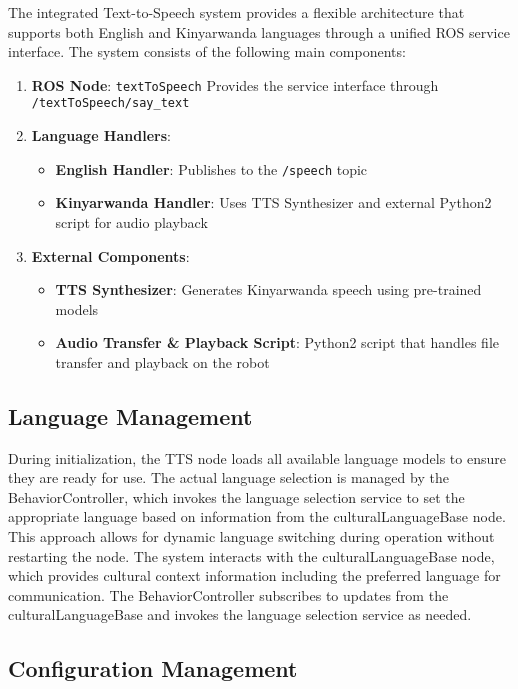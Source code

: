 \documentclass{CSSRforAfrica}
\begin{document}
The integrated Text-to-Speech system provides a flexible architecture that supports both English and Kinyarwanda languages through a unified ROS service interface. The system consists of the following main components:

\begin{enumerate}
    \item\textbf{ROS Node}: \texttt{textToSpeech} Provides the service interface through \texttt{/textToSpeech/say\_text}
    \item \textbf{Language Handlers}:
    \begin{itemize}
        \item \textbf{English Handler}: Publishes to the \texttt{/speech} topic
        \item \textbf{Kinyarwanda Handler}: Uses TTS Synthesizer and external Python2 script for audio playback
    \end{itemize}
    \item \textbf{External Components}:
    \begin{itemize}
        \item \textbf{TTS Synthesizer}: Generates Kinyarwanda speech using pre-trained models
        \item \textbf{Audio Transfer \& Playback Script}: Python2 script that handles file transfer and playback on the robot
    \end{itemize}
\end{enumerate}

\subsection{Language Management}

During initialization, the TTS node loads all available language models to ensure they are ready for use. The actual language selection is managed by the BehaviorController, which invokes the language selection service to set the appropriate language based on information from the culturalLanguageBase node. This approach allows for dynamic language switching during operation without restarting the node.
The system interacts with the culturalLanguageBase node, which provides cultural context information including the preferred language for communication. The BehaviorController subscribes to updates from the culturalLanguageBase and invokes the language selection service as needed.

\subsection{Configuration Management}
\end{document}
